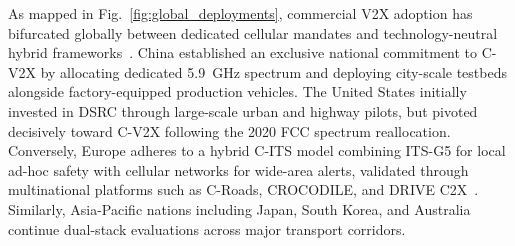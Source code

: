 As mapped in Fig.~\ref{fig:global_deployments}, commercial V2X adoption has bifurcated globally between dedicated cellular mandates and technology-neutral hybrid frameworks~\cite{hejazi2022survey}.
China established an exclusive national commitment to C-V2X by allocating dedicated 5.9~GHz spectrum and deploying city-scale testbeds alongside factory-equipped production vehicles.
The United States initially invested in DSRC through large-scale urban and highway pilots, but pivoted decisively toward C-V2X following the 2020 FCC spectrum reallocation.
Conversely, Europe adheres to a hybrid C-ITS model combining ITS-G5 for local ad-hoc safety with cellular networks for wide-area alerts, validated through multinational platforms such as C-Roads, CROCODILE, and DRIVE C2X~\cite{hejazi2022survey}.
Similarly, Asia-Pacific nations including Japan, South Korea, and Australia continue dual-stack evaluations across major transport corridors.
